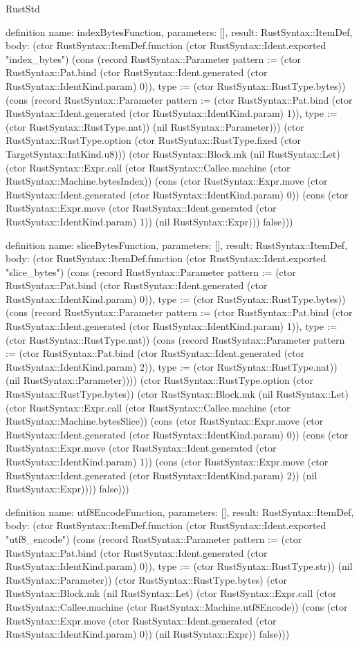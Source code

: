 \begin{lexlean}{RustStd}
\begin{semanticmodule}
definition{
  name: indexBytesFunction,
  parameters: [],
  result: RustSyntax::ItemDef,
  body: (ctor RustSyntax::ItemDef.function (ctor RustSyntax::Ident.exported "index_bytes") (cons (record RustSyntax::Parameter {pattern := (ctor RustSyntax::Pat.bind (ctor RustSyntax::Ident.generated (ctor RustSyntax::IdentKind.param) 0)), type := (ctor RustSyntax::RustType.bytes)}) (cons (record RustSyntax::Parameter {pattern := (ctor RustSyntax::Pat.bind (ctor RustSyntax::Ident.generated (ctor RustSyntax::IdentKind.param) 1)), type := (ctor RustSyntax::RustType.nat)}) (nil RustSyntax::Parameter))) (ctor RustSyntax::RustType.option (ctor RustSyntax::RustType.fixed (ctor TargetSyntax::IntKind.u8))) (ctor RustSyntax::Block.mk (nil RustSyntax::Let) (ctor RustSyntax::Expr.call (ctor RustSyntax::Callee.machine (ctor RustSyntax::Machine.bytesIndex)) (cons (ctor RustSyntax::Expr.move (ctor RustSyntax::Ident.generated (ctor RustSyntax::IdentKind.param) 0)) (cons (ctor RustSyntax::Expr.move (ctor RustSyntax::Ident.generated (ctor RustSyntax::IdentKind.param) 1)) (nil RustSyntax::Expr))) false)))
}

definition{
  name: sliceBytesFunction,
  parameters: [],
  result: RustSyntax::ItemDef,
  body: (ctor RustSyntax::ItemDef.function (ctor RustSyntax::Ident.exported "slice_bytes") (cons (record RustSyntax::Parameter {pattern := (ctor RustSyntax::Pat.bind (ctor RustSyntax::Ident.generated (ctor RustSyntax::IdentKind.param) 0)), type := (ctor RustSyntax::RustType.bytes)}) (cons (record RustSyntax::Parameter {pattern := (ctor RustSyntax::Pat.bind (ctor RustSyntax::Ident.generated (ctor RustSyntax::IdentKind.param) 1)), type := (ctor RustSyntax::RustType.nat)}) (cons (record RustSyntax::Parameter {pattern := (ctor RustSyntax::Pat.bind (ctor RustSyntax::Ident.generated (ctor RustSyntax::IdentKind.param) 2)), type := (ctor RustSyntax::RustType.nat)}) (nil RustSyntax::Parameter)))) (ctor RustSyntax::RustType.option (ctor RustSyntax::RustType.bytes)) (ctor RustSyntax::Block.mk (nil RustSyntax::Let) (ctor RustSyntax::Expr.call (ctor RustSyntax::Callee.machine (ctor RustSyntax::Machine.bytesSlice)) (cons (ctor RustSyntax::Expr.move (ctor RustSyntax::Ident.generated (ctor RustSyntax::IdentKind.param) 0)) (cons (ctor RustSyntax::Expr.move (ctor RustSyntax::Ident.generated (ctor RustSyntax::IdentKind.param) 1)) (cons (ctor RustSyntax::Expr.move (ctor RustSyntax::Ident.generated (ctor RustSyntax::IdentKind.param) 2)) (nil RustSyntax::Expr)))) false)))
}

definition{
  name: utf8EncodeFunction,
  parameters: [],
  result: RustSyntax::ItemDef,
  body: (ctor RustSyntax::ItemDef.function (ctor RustSyntax::Ident.exported "utf8_encode") (cons (record RustSyntax::Parameter {pattern := (ctor RustSyntax::Pat.bind (ctor RustSyntax::Ident.generated (ctor RustSyntax::IdentKind.param) 0)), type := (ctor RustSyntax::RustType.str)}) (nil RustSyntax::Parameter)) (ctor RustSyntax::RustType.bytes) (ctor RustSyntax::Block.mk (nil RustSyntax::Let) (ctor RustSyntax::Expr.call (ctor RustSyntax::Callee.machine (ctor RustSyntax::Machine.utf8Encode)) (cons (ctor RustSyntax::Expr.move (ctor RustSyntax::Ident.generated (ctor RustSyntax::IdentKind.param) 0)) (nil RustSyntax::Expr)) false)))
}


\end{semanticmodule}
\end{lexlean}
